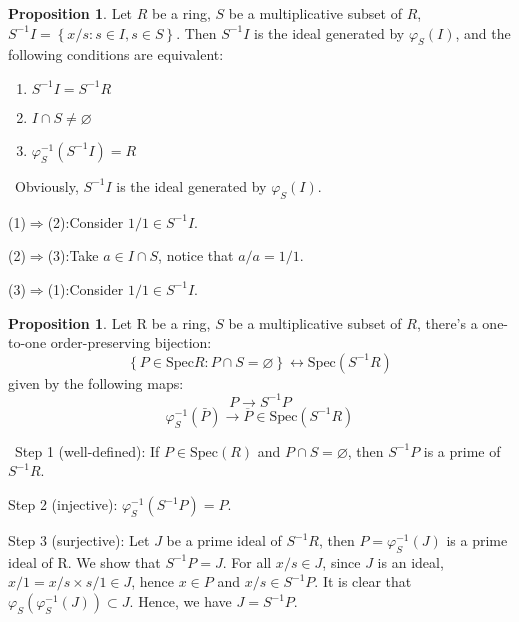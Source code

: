 \documentclass[a4paper,12pt]{article}
\newenvironment{prooff}{{\noindent\it\textcolor{cyan!40!black}{Proof}:}\,}{\par}
\newcommand{\bbrace}[1]{\left\{ #1 \right\} }
\theoremstyle{definition}
\newtheorem{prop}[defn]{Proposition}
\begin{document}
\begin{prop}
    Let $R$ be a ring, $S$ be a multiplicative subset of $R$,\\
    $S^{-1}I=\bbrace{x/s:s\in I,s\in S}$.
    Then $S^{-1}I$ is the ideal generated by $\varphi_S(I)$, and the following conditions are equivalent:
    \begin{enumerate}[(1)]
        \item $S^{-1}I=S^{-1}R$
        \item $I\cap S\neq \varnothing$
        \item $\varphi_S^{-1}(S^{-1}I)=R$
    \end{enumerate}
    \label{proposition:I cap S=0 equivalent condition}
\end{prop}
\begin{prooff}
    Obviously, $S^{-1}I$ is the ideal generated by $\varphi_S(I)$.

    (1)$\Rightarrow$(2):Consider $1/1\in S^{-1}I$.

    (2)$\Rightarrow$(3):Take $a\in I\cap S$, notice that $a/a=1/1$.

    (3)$\Rightarrow$(1):Consider $1/1\in S^{-1}I$.
\end{prooff}
\begin{prop}
    Let R be a ring, $S$ be a multiplicative subset of $R$, there's a one-to-one order-preserving bijection:
    \begin{equation*}
        \bbrace{P\in \text{Spec}R: P\cap S=\varnothing }\longleftrightarrow \text{Spec}(S^{-1}R)
    \end{equation*}
    given by the following maps:
    \begin{equation*}
        P\longrightarrow S^{-1}P
    \end{equation*}
    \begin{equation*}
        \varphi_S^{-1}(\bar{P})\longrightarrow \overline{P}\in \text{Spec}(S^{-1}R)
    \end{equation*}
\end{prop}
\begin{prooff}
    Step 1 (well-defined): If $P\in \text{Spec}(R)$ and $P\cap S=\varnothing$, then $S^{-1}P$ is a prime of $S^{-1}R$.

    Step 2 (injective): $\varphi_S^{-1}(S^{-1}P)=P$.

    Step 3 (surjective): Let $J$ be a prime ideal of $S^{-1}R$, then $P=\varphi_S^{-1}(J)$ is a prime ideal of R. We show that $S^{-1}P=J$. For all $x/s\in J$, since $J$ is an ideal, $x/1=x/s\times s/1  \in J$, hence $x\in P$ and $x/s\in S^{-1}P$.
    It is clear that $\varphi_S(\varphi_S^{-1}(J))\subset J$. Hence, we have $J=S^{-1}P$.
\end{prooff}
\end{document}
